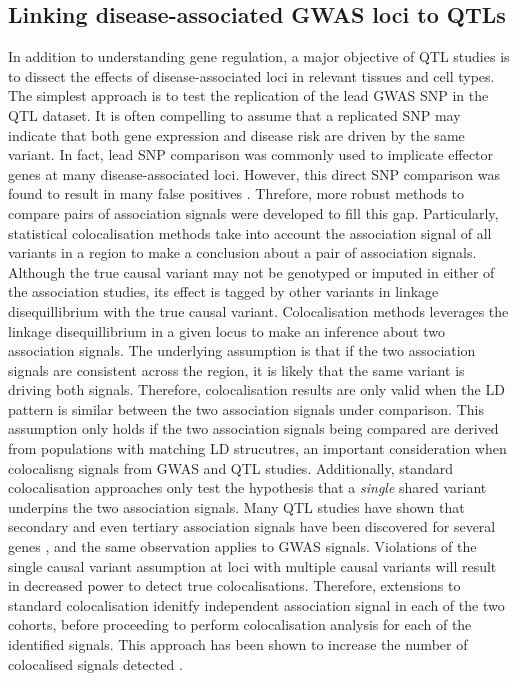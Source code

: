 \subsection{Linking disease-associated GWAS loci to QTLs}
In addition to understanding gene regulation, a major objective of QTL studies is to dissect the effects of disease-associated loci in relevant tissues and cell types. The simplest approach is to test the replication of the lead GWAS SNP in the QTL dataset. It is often compelling to assume that a replicated SNP may indicate that both gene expression and disease risk are driven by the same variant. In fact, lead SNP comparison was commonly used to implicate effector genes at many disease-associated loci. However, this direct SNP comparison was found to result in many false positives \cite{Liu2019-fv}. Threfore, more robust methods to compare pairs of association signals were developed to fill this gap. Particularly, statistical colocalisation methods take into account the association signal of all variants in a region to make a conclusion about a pair of association signals. Although the true causal variant may not be genotyped or imputed in either of the association studies, its effect is tagged by other variants in linkage disequillibrium with the true causal variant. Colocalisation methods leverages the linkage disequillibrium in a given locus to make an inference about two association signals. The underlying assumption is that if the two association signals are consistent across the region, it is likely that the same variant is driving both signals. Therefore, colocalisation results are only valid when the LD pattern is similar between the two association signals under comparison. This assumption only holds if the two association signals being compared are derived from populations with matching LD strucutres, an important consideration when colocalisng signals from GWAS and QTL studies. Additionally, standard colocalisation approaches only test the hypothesis that a \textit{single} shared variant underpins the two association signals. Many QTL studies have shown that secondary and even tertiary association signals have been discovered for several genes \cite{macromap-eqtl,De_Klein2023-ku}, and the same observation applies to GWAS signals. Violations of the single causal variant assumption at loci with multiple causal variants will result in decreased power to detect true colocalisations. Therefore, extensions to standard colocalisation idenitfy independent association signal in each of the two cohorts, before proceeding to perform colocalisation analysis for each of the identified signals. This approach has been shown to increase the number of colocalised signals detected \cite{Wallace2021-rv}.\\  


